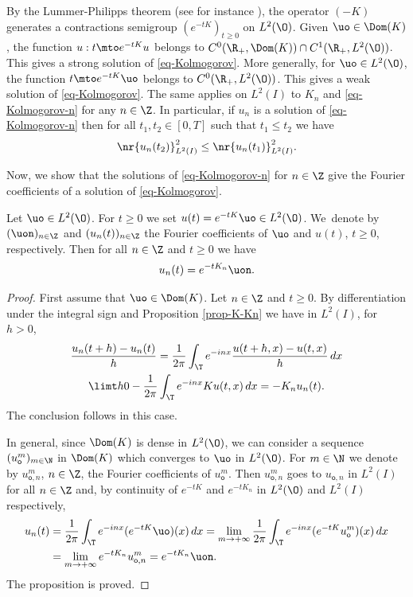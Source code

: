 By the Lummer-Philipps theorem (see for instance \cite{engel}), the operator $(-K)$ generates a contractions semigroup $(e^{-tK})_{t \geq 0}$ on $L^2(\O)$. Given $\uo \in \Dom(K)$, the function $u : t \mto e^{-tK} u$ belongs to $C^0(\R_+,\Dom(K)) \cap C^1(\R_+,L^2(\O))$. This gives a strong solution of \eqref{eq-Kolmogorov}. More generally, for $\uo \in L^2(\O)$, the function $t \mto e^{-tK} \uo$ belongs to $C^0(\R_+,L^2(\O))$. This gives a weak solution of \eqref{eq-Kolmogorov}. The same applies on $L^2(I)$ to $K_n$ and \eqref{eq-Kolmogorov-n} for any $n \in \Z$. In particular, if $u_n$ is a solution of \eqref{eq-Kolmogorov-n} then for all $t_1,t_2 \in [0,T]$ such that $t_1 \leq t_2$ we have
\begin{equation} \label{eq-semigroup-contraction}
\nr{u_n(t_2)}_{L^2(I)}^2 \leq \nr{u_n(t_1)}_{L^2(I)}^2.
\end{equation}

Now, we show that the solutions of \eqref{eq-Kolmogorov-n} for $n \in \Z$ give the Fourier coefficients of a solution of \eqref{eq-Kolmogorov}.

\begin{proposition} \label{prop-Fourier-propagateurs}
Let $\uo \in L^2(\O)$. For $t \geq 0$ we set $u(t) = e^{-tK} \uo \in L^2(\O)$. We~denote by $(\uon)_{n \in \Z}$ and $(u_n(t))_{n \in \Z}$ the Fourier coefficients of $\uo$ and $u(t)$, $t \geq 0$, respectively. Then for all $n \in \Z$ and $t \geq 0$ we have
\[
u_n(t) = e^{-t K_n} \uon.
\]
\end{proposition}

\begin{proof}
First assume that $\uo \in \Dom(K)$. Let $n \in \Z$ and $t \geq 0$. By differentiation under the integral sign and Proposition \ref{prop-K-Kn} we have in $L^2(I)$, for $h > 0$,
\begin{multline*}
\frac {u_n(t+h) - u_n(t)} h = \frac 1 {2\pi} \int_\T e^{-inx} \frac {u(t+h,x) - u(t,x)} h \, dx\\
\limt h 0 - \frac 1 {2\pi} \int_\T e^{-inx} K u(t,x) \, dx = -K_n u_n(t).
\end{multline*}
The conclusion follows in this case.

In general, since $\Dom(K)$ is dense in $L^2(\O)$, we can consider a sequence $(u_{\mathsf{o}}^m)_{m \in \N}$ in $\Dom(K)$ which converges to $\uo$ in $L^2(\O)$. For $m \in \N$ we denote by $u_{\mathsf{o},n}^m$, $n \in \Z$, the Fourier coefficients of $u_{\mathsf{o}}^m$. Then $u_{\mathsf{o},n}^m$ goes to $u_{\mathsf{o},n}$ in $L^2(I)$ for all $n \in \Z$ and, by continuity of $e^{-tK}$ and $e^{-tK_n}$ in $L^2(\O)$ and $L^2(I)$ respectively,
\begin{align*}
u_n(t)
& = \frac 1 {2\pi} \int_\T e^{-inx} (e^{-tK} \uo)(x) \,dx = \lim_{m \to +\infty} \frac 1 {2\pi} \int_\T e^{-inx} (e^{-tK} u_{\mathsf{o}}^m)(x) \,dx\\
& = \lim_{m \to +\infty} e^{-tK_n} u_{\mathsf{o},n}^m = e^{-tK_n} \uon.
\end{align*}
The proposition is proved.
\end{proof}

